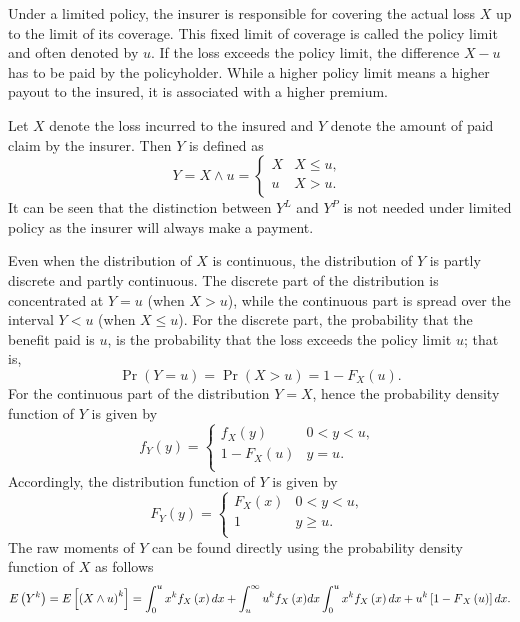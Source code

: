 \documentclass[]{book}
\theoremstyle{definition}
\theoremstyle{definition}
\theoremstyle{definition}
\theoremstyle{remark}
\begin{document}
Under a limited policy, the insurer is responsible for covering the
actual loss \(X\) up to the limit of its coverage. This fixed limit of
coverage is called the policy limit and often denoted by \(u\). If the
loss exceeds the policy limit, the difference \(X - u\) has to be paid
by the policyholder. While a higher policy limit means a higher payout
to the insured, it is associated with a higher premium.

Let \(X\) denote the loss incurred to the insured and \(Y\) denote the
amount of paid claim by the insurer. Then \(Y\) is defined as
\[Y = X \land u = \left\{ \begin{matrix}
X & X \leq u, \\
u & X > u. \\
\end{matrix} \right.\ \] It can be seen that the distinction between
\(Y^{L}\) and \(Y^{P}\) is not needed under limited policy as the
insurer will always make a payment.

Even when the distribution of \(X\) is continuous, the distribution of
\(Y\) is partly discrete and partly continuous. The discrete part of the
distribution is concentrated at \(Y = u\) (when \(X > u\)), while the
continuous part is spread over the interval \(Y < u\) (when
\(X \leq u\)). For the discrete part, the probability that the benefit
paid is \(u\), is the probability that the loss exceeds the policy limit
\(u\); that is,
\[\Pr \left( Y = u \right) = \Pr \left( X > u \right) = {1 - F}_{X}\left( u \right).\]
For the continuous part of the distribution \(Y = X\), hence the
probability density function of \(Y\) is given by
\[f_{Y}\left( y \right) = \left\{ \begin{matrix}
f_{X}\left( y \right) & 0 < y < u, \\
1 - F_{X}\left( u \right) & y = u. \\
\end{matrix} \right.\ \] Accordingly, the distribution function of \(Y\)
is given by \[F_{Y}\left( y \right) = \left\{ \begin{matrix}
F_{X}\left( x \right) & 0 < y < u, \\
1 & y \geq u. \\
\end{matrix} \right.\ \] The raw moments of \(Y\) can be found directly
using the probability density function of \(X\) as follows
\[E\left( Y^{k} \right) = E\left\lbrack \left( X \land u \right)^{k} \right\rbrack = \int_{0}^{u}x^{k}f_{X}\left( x \right)dx + \int_{u}^{\infty}{u^{k}f_{X}\left( x \right)} dx \\ \int_{0}^{u}x^{k}f_{X}\left( x \right)dx + u^{k}\left\lbrack {1 - F}_{X}\left( u \right) \right\rbrack dx.\]
\end{document}
